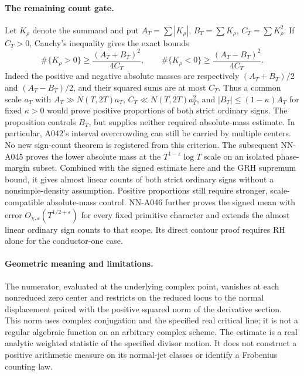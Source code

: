 \paragraph{The remaining count gate.}
Let $K_\rho$ denote the summand and put
$A_T=\sum|K_\rho|$, $B_T=\sum K_\rho$,
$C_T=\sum K_\rho^2$. If $C_T>0$, Cauchy's inequality gives
the exact bounds
\[
 \#\{K_\rho>0\}\ge\frac{(A_T+B_T)^2}{4C_T},
 \qquad
 \#\{K_\rho<0\}\ge\frac{(A_T-B_T)^2}{4C_T}.
\]
Indeed the positive and negative absolute masses are respectively
$(A_T+B_T)/2$ and $(A_T-B_T)/2$, and their squared sums
are at most $C_T$. Thus a common scale $a_T$ with
$A_T\gg N(T,2T)a_T$, $C_T\ll N(T,2T)a_T^2$, and
$|B_T|\le(1-\kappa)A_T$ for fixed $\kappa>0$ would prove
positive proportions of both strict ordinary signs. The
proposition controls $B_T$, but supplies neither required
absolute-mass estimate. In particular, A042's interval
overcrowding can still be carried by multiple centers.
No new sign-count theorem is registered from this criterion.
The subsequent NN-A045 proves the lower absolute mass at
the \(T^{1-\varepsilon}\log T\) scale on an isolated
phase-margin subset. Combined with the signed estimate here
and the GRH supremum bound, it gives almost linear counts of
both strict ordinary signs without a nonsimple-density
assumption. Positive proportions still require stronger,
scale-compatible absolute-mass control.
NN-A046 further proves the signed mean with error
\(O_{\chi,\varepsilon}(T^{1/2+\varepsilon})\) for every
fixed primitive character and extends the almost linear
ordinary sign counts to that scope. Its direct contour
proof requires RH alone for the conductor-one case.

\paragraph{Geometric meaning and limitations.}
The numerator, evaluated at the underlying complex point,
vanishes at each nonreduced zero center and
restricts on the reduced locus to the normal displacement
paired with the positive squared norm of the derivative
section. This norm uses complex conjugation and the specified
real critical line; it is not a regular algebraic function
on an arbitrary complex scheme. The estimate is a real
analytic weighted statistic of the specified divisor motion.
It does not construct a positive arithmetic measure on its
normal-jet classes or identify a Frobenius counting law.

